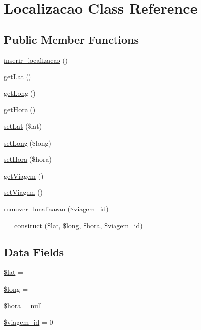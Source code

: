 \hypertarget{class_localizacao}{}\section{Localizacao Class Reference}
\label{class_localizacao}
\subsection*{Public Member Functions}
\begin{DoxyCompactItemize}
\item 
\hyperlink{class_localizacao_a30786aee2cdc08535a08fec7589e100f}{inserir\+\_\+localizacao} ()
\item 
\hyperlink{class_localizacao_ace4646478052fb05a9226af2f1db07fa}{get\+Lat} ()
\item 
\hyperlink{class_localizacao_a8be7ca89e0d4e1d340487e55301a14dd}{get\+Long} ()
\item 
\hyperlink{class_localizacao_a0d22cd2d80aedf38e7afa8b1529f611b}{get\+Hora} ()
\item 
\hyperlink{class_localizacao_a25b3098601cade6a6a1067a1dfae110b}{set\+Lat} (\$lat)
\item 
\hyperlink{class_localizacao_a0ce73e7ff692ff7bf173cf5e7f09c4f9}{set\+Long} (\$long)
\item 
\hyperlink{class_localizacao_acd7dc385d6cb4ac0ee0c292d4dce3b33}{set\+Hora} (\$hora)
\item 
\hyperlink{class_localizacao_afed87975f72f29077382a02ee7b65d2c}{get\+Viagem} ()
\item 
\hyperlink{class_localizacao_aef46a185508f8c2d7c1fc148fe3b606e}{set\+Viagem} ()
\item 
\hyperlink{class_localizacao_a9b3ad5ba8c85905c9bbdf452620e74d0}{remover\+\_\+localizacao} (\$viagem\+\_\+id)
\item 
\hyperlink{class_localizacao_ac2fdcd99b1f93dd19d4eeab33f325cb1}{\+\_\+\+\_\+construct} (\$lat, \$long, \$hora, \$viagem\+\_\+id)
\end{DoxyCompactItemize}
\subsection*{Data Fields}
\begin{DoxyCompactItemize}
\item 
\hyperlink{class_localizacao_af498b42b83afed4dfe0af05fd802776c}{\$lat} = \textquotesingle{}\textquotesingle{}
\item 
\hyperlink{class_localizacao_a30223182013e2964ccbd7c134b3c52c1}{\$long} = \textquotesingle{}\textquotesingle{}
\item 
\hyperlink{class_localizacao_a53d7d011255eafe8a37815fd36055cf3}{\$hora} = null
\item 
\hyperlink{class_localizacao_ab312bd69638ac149afd702469afbee71}{\$viagem\+\_\+id} = 0
\end{DoxyCompactItemize}



